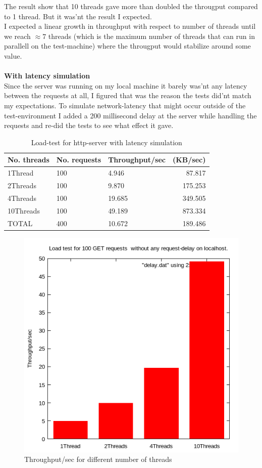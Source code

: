 \documentclass[a4paper, 11pt]{article}
\begin{document}
The result show that 10 threads gave more than doubled the througput compared to 1 thread. But it was'nt the result I expected. \\
I expected a linear growth in throughput with respect to number of threads until we reach $\approx 7$ threads (which is the maximum number of threads that can run in parallell on the test-machine) where the througput would stabilize around some value. \\ \\ 
\textbf{With latency simulation} \\ 
Since the server was running on my local machine it barely was'nt any latency between the requests at all, I figured that was the reason the tests did'nt match my expectations.
To simulate network-latency that might occur outside of the test-environment I added a 200 millisecond delay at the server while handling the requests and re-did the tests to see what  effect it gave.
\begin{table}[H]
\centering
\label{Load-test for http-server with latency simulation}
\begin{tabular}{|l|l|l|r|}
\hline
\textbf{No. threads}  & \textbf{No. requests}  & \textbf{Throughput/sec} & \textbf{(KB/sec)} \\ \hline
1Thread & 100 & 4.946 & 87.817 \\ \hline
2Threads & 100 & 9.870 & 175.253 \\ \hline
4Threads & 100 & 19.685 & 349.505 \\ \hline
10Threads & 100 & 49.189 & 873.334 \\ \hline
TOTAL & 400 & 10.672 & 189.486 \\ \hline
\end{tabular}
\caption{Load-test for http-server with latency simulation}
\end{table}
\begin{figure}[H]
\includegraphics[scale=0.7]{delay.png}
\caption{Throughput/sec for different number of threads}
\end{figure}
\end{document}
